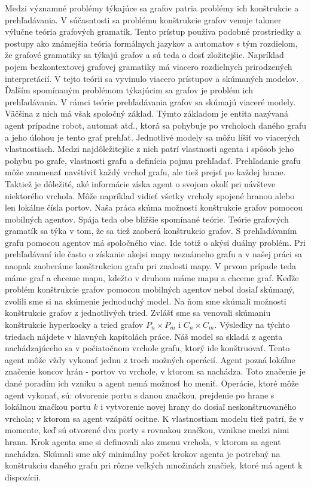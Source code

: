 Medzi významné problémy týkajúce sa grafov patria problémy ich
konštrukcie a prehľadávania. V súčasntosti sa problému konštrukcie grafov
venuje takmer výlučne teória grafových gramatík. Tento prístup používa
podobné prostriedky a postupy ako známejšia teória formálnych jazykov a
automatov s tým rozdielom, že grafové gramatiky sa týkajú grafov a sú teda o
dosť zložitejšie. Napríklad pojem bezkontextovej grafovej gramatiky má
viacero rozdielnych prirodzených interpretácií. V tejto teórii sa vyvinulo
viacero prístupov a skúmaných modelov.
Ďalším spomínaným problémom týkajúcim sa grafov je problém ich prehľadávania.
V rámci teórie prehľadávania grafov sa skúmajú viaceré modely. Väčšina z
nich má však spoločný základ. Týmto základom je entita nazývaná agent
prípadne robot, automat atď., ktorá sa pohybuje po vrcholoch daného grafu 
a jeho úlohou
je tento graf prehľať. Jednotlivé modely sa môžu líšiť vo viacerých 
vlastnostiach.
Medzi najdôležitejšie z nich patrí vlastnosti agenta i spôsob jeho pohybu 
po grafe, vlastnosti grafu a definícia pojmu prehľadať. Prehľadanie grafu môže
znamenať navštíviť každý vrchol grafu, ale tiež prejsť po každej hrane.
Taktiež je dôležité, aké informácie získa agent o svojom okolí pri návšteve
niektorého vrchola. Môže napríklad vidieť všetky vrcholy spojené hranou alebo
len lokálne čísla portov.
Naša práca skúma možnosti konštrukcie grafov pomocou mobilných agentov.
Spája teda obe bližšie spomínané teórie. Teórie grafových gramatík sa týka v
tom, že sa tiež zaoberá konštrukcio grafov. S prehľadávaním grafu pomocou
agentov má spoločného viac. Ide totiž o akýsi duálny problém. Pri
prehľadávaní ide často o získanie akejsi mapy neznámeho grafu a v našej
práci sa naopak zaoberáme konštrukciou grafu pri znalosti mapy. V prvom
prípade teda máme graf a chceme mapu, kdežto v druhom máme mapu a chceme
graf.
Keďže problém konštrukcie grafov pomocou mobilných agentov nebol dosiaľ
skúmaný, zvolili sme si na skúmenie jednoduchý model.
Na ňom sme skúmali možnosti konštrukcie grafov z jednotlivých tried. Zvlášť
sme sa venovali skúmaniu konštrukcie hyperkocky a tried grafov $P_{n} \times
P_{m}$ i $C_{n} \times C_{m}$. Výsledky na týchto triedach nájdete v
hlavných kapitolách práce.
Náš model sa skladá z
agenta nachádzajúceho sa v počiatočnom vrchole grafu, ktorý ide konštruovať.
Tento agent môže vždy vykonať jednu z troch možných operácií. Agent pozná
lokálne značenie koncov hrán - portov vo vrchole, v ktorom sa nachádza.
Toto značenie je dané poradím ich vzniku a agent nemá možnosť ho meniť.
Operácie, ktoré môže agent vykonať, sú: otvorenie portu s danou značkou,
prejdenie po hrane s lokálnou značkou portu $k$ i vytvorenie novej hrany do
dosiaľ neskonštruovaného vrchola; v ktorom sa agent vzápätí ocitne. K
vlastnostiam modelu tiež patrí, že v momente, keď sú otvorené dva porty s
rovnakou značkou, vznikne medzi nimi hrana.
Krok agenta sme si definovali ako zmenu vrchola, v ktorom sa agent nachádza.
Skúmali sme aký minimálny počet krokov agenta je potrebný na konštrukciu
daného grafu pri rôzne veľkých množinách značiek, ktoré má agent k
dispozícii.

